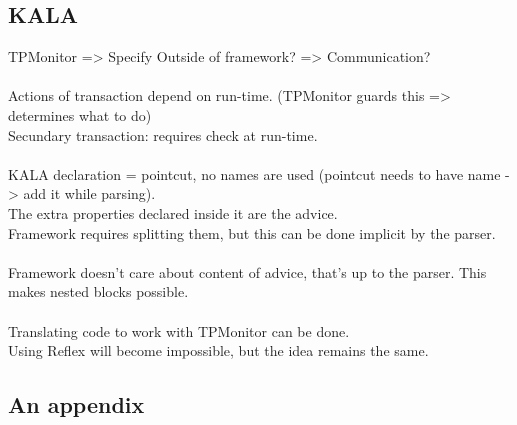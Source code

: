 \documentclass[a4paper]{report}
\begin{document}
\section{KALA}
TPMonitor => Specify Outside of framework? => Communication?\\
\\
Actions of transaction depend on run-time. (TPMonitor guards this => determines what to do)\\
Secundary transaction: requires check at run-time.\\
\\
KALA declaration = pointcut, no names are used (pointcut needs to have name -> add it while parsing).\\
The extra properties declared inside it are the advice.\\
Framework requires splitting them, but this can be done implicit by the parser.\\
\\
Framework doesn't care about content of advice, that's up to the parser. This makes nested blocks possible.\\
\\
Translating code to work with TPMonitor can be done.\\
Using Reflex will become impossible, but the idea remains the same.\\

\backpages
\begin{appendices}
\chapter{An appendix}
\label{chapt:appendix}

\end{appendices}

%
%  
\end{document}
